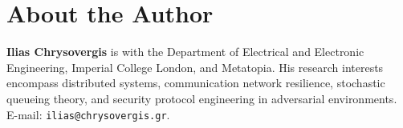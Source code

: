\documentclass[12pt,onecolumn]{article}
\begin{document}
\section*{About the Author}
\noindent\textbf{Ilias Chrysovergis} is with the Department of Electrical and Electronic Engineering, Imperial College London, and Metatopia. His research interests encompass distributed systems, communication network resilience, stochastic queueing theory, and security protocol engineering in adversarial environments. E-mail: \texttt{ilias@chrysovergis.gr}.
\end{document}
